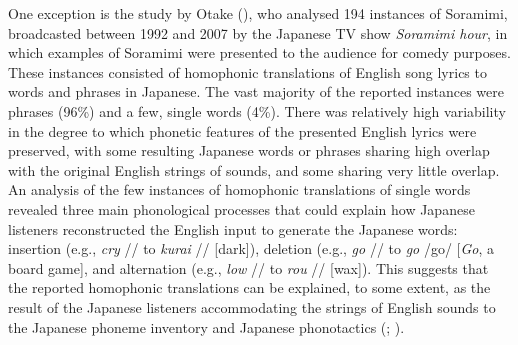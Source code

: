 \documentclass[
]{article}
\begin{document}
One exception is the study by Otake
(), who analysed 194 instances
of Soramimi, broadcasted between 1992 and 2007 by the Japanese TV show
\emph{Soramimi hour}, in which examples of Soramimi were presented to
the audience for comedy purposes. These instances consisted of
homophonic translations of English song lyrics to words and phrases in
Japanese. The vast majority of the reported instances were phrases
(96\%) and a few, single words (4\%). There was relatively high
variability in the degree to which phonetic features of the presented
English lyrics were preserved, with some resulting Japanese words or
phrases sharing high overlap with the original English strings of
sounds, and some sharing very little overlap. An analysis of the few
instances of homophonic translations of single words revealed three main
phonological processes that could explain how Japanese listeners
reconstructed the English input to generate the Japanese words:
insertion (e.g., \emph{cry} // to \emph{kurai}
// {[}dark{]}), deletion (e.g., \emph{go} //
to \emph{go} /go/ {[}\emph{Go}, a board game{]}, and alternation (e.g.,
\emph{low} // to \emph{rou} // {[}wax{]}).
This suggests that the reported homophonic translations can be
explained, to some extent, as the result of the Japanese listeners
accommodating the strings of English sounds to the Japanese phoneme
inventory and Japanese phonotactics
(;
).
\end{document}
